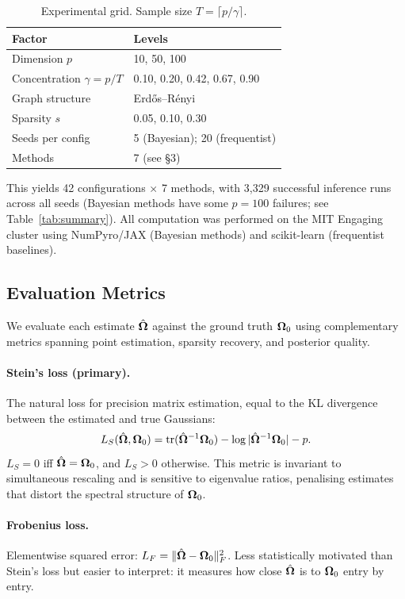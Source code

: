 \documentclass[10pt,conference,compsoc]{IEEEtran}
\newcommand{\tr}{\operatorname{tr}} \newcommand{\KL}{\operatorname{KL}} \newcommand{\ELBO}{\operatorname{ELBO}}
\begin{document}
\begin{table}[ht]
\centering
\caption{Experimental grid. Sample size $T = \lceil p/\gamma \rceil$.}
\label{tab:grid}
\small
\begin{tabular}{@{}ll@{}}
\toprule
\textbf{Factor} & \textbf{Levels} \\
\midrule
Dimension $p$ & 10, 50, 100 \\
Concentration $\gamma = p/T$ & 0.10, 0.20, 0.42, 0.67, 0.90 \\
Graph structure & Erd\H{o}s--R\'{e}nyi \\
Sparsity $s$ & 0.05, 0.10, 0.30 \\
Seeds per config & 5 (Bayesian); 20 (frequentist) \\
Methods & 7 (see \S3) \\
\bottomrule
\end{tabular}
\end{table}
This yields 42 configurations $\times$ 7 methods, with 3{,}329 successful inference runs across all seeds (Bayesian methods have some $p{=}100$ failures; see Table~\ref{tab:summary}). All computation was performed on the MIT Engaging cluster using NumPyro/JAX (Bayesian methods) and scikit-learn (frequentist baselines).

\subsection{Evaluation Metrics}

We evaluate each estimate $\hat{\bm{\Omega}}$ against the ground truth $\bm{\Omega}_0$ using complementary metrics spanning point estimation, sparsity recovery, and posterior quality.

\paragraph{Stein's loss (primary).} The natural loss for precision matrix estimation, equal to the KL divergence between the estimated and true Gaussians:
\begin{equation}
  L_S(\hat\bOmega, \bOmega_0) = \tr(\hat\bOmega^{-1}\bOmega_0) - \log|\hat\bOmega^{-1}\bOmega_0| - p.
  \label{eq:steins}
\end{equation}
$L_S = 0$ iff $\hat{\bm{\Omega}} = \bm{\Omega}_0$, and $L_S > 0$ otherwise. This metric is invariant to simultaneous rescaling and is sensitive to eigenvalue ratios, penalising estimates that distort the spectral structure of $\bm{\Omega}_0$.

\paragraph{Frobenius loss.} Elementwise squared error: $L_F = \|\hat{\bm{\Omega}} - \bm{\Omega}_0\|_F^2$. Less statistically motivated than Stein's loss but easier to interpret: it measures how close $\hat{\bm{\Omega}}$ is to $\bm{\Omega}_0$ entry by entry.
\end{document}
